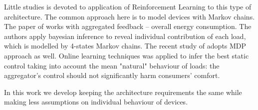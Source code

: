 Little studies is devoted to application of Reinforcement Learning to this type of architecture. The common approach here is to model devices with Markov chains. The paper of \cite{Taylor2014} works with aggregated feedback -- overall energy consumption. The authors apply bayesian inference to reveal individual contribution of each load, which is modelled by 4-states Markov chains. The recent study of \cite{Chertkov2017} adopts MDP approach as well. Online learning techniques was applied to infer the best static control taking into account the mean "natural" behaviour of loads: the aggregator's control should not significantly harm consumers' comfort. 

In this work we develop \cite{Chertkov2017} keeping the architecture requirements the same while making less assumptions on individual behaviour of devices. 